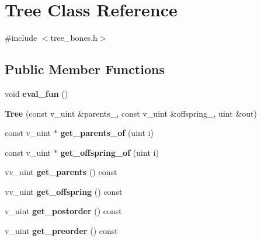\hypertarget{classTree}{}\section{Tree Class Reference}
\label{classTree}


{\ttfamily \#include $<$tree\+\_\+bones.\+h$>$}

\subsection*{Public Member Functions}
\begin{DoxyCompactItemize}
\item 
void {\bfseries eval\+\_\+fun} ()\hypertarget{classTree_a5a24565d179a3bd6edae1ff323060a93}{}\label{classTree_a5a24565d179a3bd6edae1ff323060a93}

\item 
{\bfseries Tree} (const v\+\_\+uint \&parents\+\_\+, const v\+\_\+uint \&offspring\+\_\+, uint \&out)\hypertarget{classTree_a0f964d9ba9834822d3e18946a5361839}{}\label{classTree_a0f964d9ba9834822d3e18946a5361839}

\item 
const v\+\_\+uint $\ast$ {\bfseries get\+\_\+parents\+\_\+of} (uint i)\hypertarget{classTree_adb9bede67bc875b58bb240d4c5421821}{}\label{classTree_adb9bede67bc875b58bb240d4c5421821}

\item 
const v\+\_\+uint $\ast$ {\bfseries get\+\_\+offspring\+\_\+of} (uint i)\hypertarget{classTree_a02c43c8a0bb0e7be7bf33436a8c05b30}{}\label{classTree_a02c43c8a0bb0e7be7bf33436a8c05b30}

\item 
vv\+\_\+uint {\bfseries get\+\_\+parents} () const \hypertarget{classTree_ae4f36e6d306946015965a7d9bc577a2a}{}\label{classTree_ae4f36e6d306946015965a7d9bc577a2a}

\item 
vv\+\_\+uint {\bfseries get\+\_\+offspring} () const \hypertarget{classTree_af8780369e1bc3a0d4e396bb91ad85a72}{}\label{classTree_af8780369e1bc3a0d4e396bb91ad85a72}

\item 
v\+\_\+uint {\bfseries get\+\_\+postorder} () const \hypertarget{classTree_a333503b86f195c8e84248a59eefe2fdf}{}\label{classTree_a333503b86f195c8e84248a59eefe2fdf}

\item 
v\+\_\+uint {\bfseries get\+\_\+preorder} () const \hypertarget{classTree_a22f81a8b7062b224f13dd1f2e7a1f7e0}{}\label{classTree_a22f81a8b7062b224f13dd1f2e7a1f7e0}


\end{DoxyCompactItemize}
